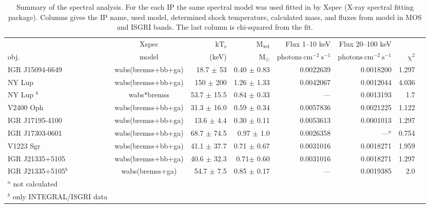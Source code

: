 \documentclass[oneside,a4paper,11pt]{report}
\begin{document}
\begin{table}
\begin{center}
\caption{Summary of the spectral analysis. For the each IP the same spectral model was used fitted in by Xspec (X-ray spectral fitting package). Columns gives the IP name, used model, determined shock temperature, calculated mass, and fluxes from model in MOS and ISGRI bands. The last column is chi-squared from the fit.}
\begin{tabular}{lcrrrrrr}
\hline
\hline
     & Xspec & $\mathrm{kT_s}$& $\mathrm{M_{wd}}$   & Flux 1--10 keV                      & Flux 20--100 keV                      &         \\
obj. & model & (keV)          & $\mathrm{M_{\odot}}$& $\mathrm{photons\:cm^{-2}\:s^{-1}}$ & $\mathrm{photons\:cm^{-2}\:s^{-1}}$& $\mathrm{\chi}^2$         \\ 
\hline
IGR J15094-6649    & wabs(bremss+bb+ga) & 18.7 $\pm$ 53  & 0.40  $\pm$ 0.83  &0.0022639&0.0018200&1.297 \\
NY Lup             & wabs(bremss+bb+ga) & 150 $\pm$ 200  & 1.26 $\pm$ 1.33 &0.0042067 &0.0012044&4.036      \\
NY Lup $^b$	   & wabs*bremss        & 53.7 $\pm$ 15.5 &  0.84  $\pm$ 0.33  & ---&0.0013193 & 1.7\\
V2400 Oph          & wabs(bremss+bb+ga) & 31.3 $\pm$ 16.0      &0.59 $\pm$ 0.34&0.0057836&0.0021225&      1.122      \\
IGR J17195-4100    & wabs(bremss+bb+ga) & 13.6 $\pm$ 4.4       & 0.30 $\pm$ 0.11&0.0053613&0.0001013& 1.297 \\
IGR J17303-0601    & wabs(bremss+bb+ga) & 68.7 $\pm$ 74.5     & 0.97 $\pm$ 1.0 &0.0026358& ---$^a$&  0.754        \\
V1223 Sgr          & wabs(bremss+bb+ga) & 41.1 $\pm$ 37.7      &0.71 $\pm$ 0.67&0.0031016&0.0018271&  1.959           \\
IGR J21335+5105    & wabs(bremss+bb+ga) & 40.6 $\pm$ 32.3      &0.71$\pm$ 0.60&0.0031016& 0.0018271&        1.297        \\
IGR J21335+5105$^b$& wabs(bremss+ga)    & 54.7 $\pm$ 7.5      &0.85 $\pm$ 0.17 &---& 0.0019385&        2.0        \\
\hline
\footnotesize
$^a$ not calculated& &&&&& \\
\footnotesize
$^b$ only INTEGRAL/ISGRI data \\
\hline
\end{tabular}
\label{RES2}
\end{center}
\end{table}
\end{document}
